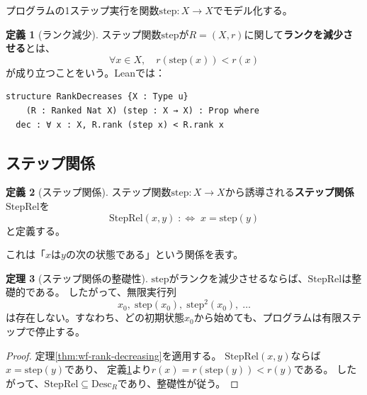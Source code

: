 \documentclass[11pt,a4paper]{ltjsarticle}
\theoremstyle{definition}
\newtheorem{definition}{定義}[section]
\newtheorem{theorem}[definition]{定理}
\begin{document}
プログラムの1ステップ実行を関数$\mathrm{step} : X \to X$でモデル化する。

\begin{definition}[ランク減少]
\label{def:rank-decreases}
ステップ関数$\mathrm{step}$が$R = (X, r)$に関して\textbf{ランクを減少させる}とは、
\[
\forall x \in X,\quad r(\mathrm{step}(x)) < r(x)
\]
が成り立つことをいう。Leanでは：
\begin{lstlisting}[style=leanstyle]
structure RankDecreases {X : Type u}
    (R : Ranked Nat X) (step : X → X) : Prop where
  dec : ∀ x : X, R.rank (step x) < R.rank x
\end{lstlisting}
\end{definition}

\subsection{ステップ関係}

\begin{definition}[ステップ関係]
ステップ関数$\mathrm{step} : X \to X$から誘導される\textbf{ステップ関係}$\mathrm{StepRel}$を
\[
\mathrm{StepRel}(x, y) \;:\!\!\iff\; x = \mathrm{step}(y)
\]
と定義する。
\end{definition}

これは「$x$は$y$の次の状態である」という関係を表す。

\begin{theorem}[ステップ関係の整礎性]
\label{thm:wf-steprel}
$\mathrm{step}$がランクを減少させるならば、$\mathrm{StepRel}$は整礎的である。
したがって、無限実行列
\[
x_0, \;\mathrm{step}(x_0), \;\mathrm{step}^2(x_0), \;\ldots
\]
は存在しない。すなわち、どの初期状態$x_0$から始めても、プログラムは有限ステップで停止する。
\end{theorem}

\begin{proof}
定理\ref{thm:wf-rank-decreasing}を適用する。
$\mathrm{StepRel}(x, y)$ならば$x = \mathrm{step}(y)$であり、
定義\ref{def:rank-decreases}より$r(x) = r(\mathrm{step}(y)) < r(y)$である。
したがって、$\mathrm{StepRel} \subseteq \mathrm{Desc}_R$であり、整礎性が従う。
\end{proof}
\end{document}
